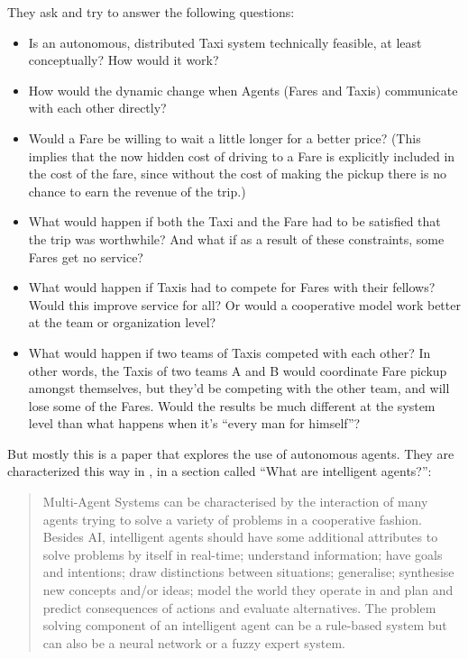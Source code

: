 \documentclass[11pt,letterpaper,onecolumn,twoside,openright,final]{report}
\begin{document}
They ask and try to answer the following questions:
\begin{itemize}
  \item{Is an autonomous, distributed Taxi system technically feasible, at least conceptually?
    How would it work?}
  \item{How would the dynamic change when Agents (Fares and Taxis) communicate with each other directly?}
  \item{Would a Fare be willing to wait a little longer for a better price?
    (This implies that the now hidden cost of driving to a Fare is explicitly included in the cost of the fare, since without the cost of making the pickup there is no chance to earn the revenue of the trip.)}
  \item{What would happen if both the Taxi and the Fare had to be satisfied that the trip was worthwhile?
    And what if as a result of these constraints, some Fares get no service?}
  \item{What would happen if Taxis had to compete for Fares with their fellows?
    Would this improve service for all?
    Or would a cooperative model work better at the team or organization level?}
  \item{What would happen if two teams of Taxis competed with each other?
    In other words, the Taxis of two teams A and B would coordinate Fare pickup amongst themselves, but they’d be competing with the other team, and will lose some of the Fares.
    Would the results be much different at the system level than what happens when it's ``every man for himself''?}
\end{itemize}

But mostly this is a paper that explores the use of autonomous agents.
They are characterized this way in \cite{roozemond2000act}, in a section called ``What are intelligent agents?'':

\begin{quote}
Multi-Agent Systems can be characterised by the interaction of many agents trying to solve a variety of problems in a cooperative fashion.
Besides AI, intelligent agents should have some additional attributes to solve problems by itself in real-time; understand information; have goals and intentions; draw distinctions between situations; generalise; synthesise new concepts and/or ideas; model the world they operate in and plan and predict consequences of actions and evaluate alternatives.
The problem solving component of an intelligent agent can be a rule-based system but can also be a neural network or a fuzzy expert system.
\end{quote}
\end{document}
